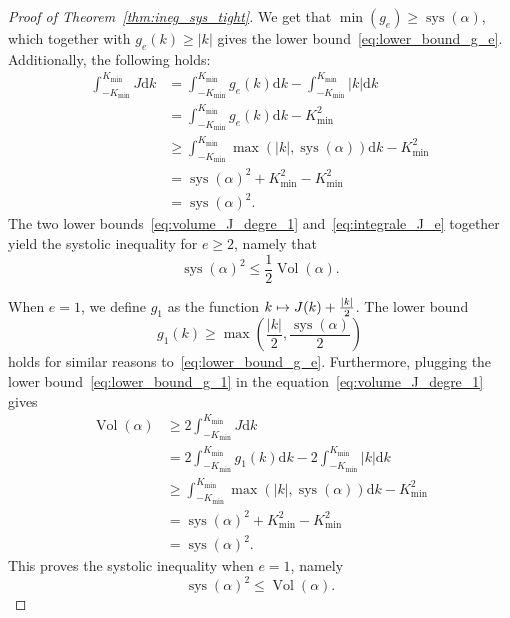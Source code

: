 \documentclass[10pt,a4paper]{amsart}
\DeclareMathOperator{\vol}{Vol}
\DeclareMathOperator{\sys}{sys}
\newcommand{\rmd}{\mathrm{d}}
\let\oldmapsto\mapsto
\renewcommand*{\mapsto}{\mathchoice{\longmapsto}{\oldmapsto}{\oldmapsto}{\oldmapsto}}
\theoremstyle{definition}\newtheorem{defi}[theo]{Definition}
\begin{document}
\begin{proof}[{Proof of Theorem~\ref{thm:ineg_sys_tight}}]
We get that $\min(g_e) \geq \sys(\alpha)$, which together with $g_e(k) \geq |k|$ gives the lower bound~\eqref{eq:lower_bound_g_e}. Additionally, the following holds:
\begin{equation}\label{eq:integrale_J_e}
\begin{split}
\int_{-K_{\min}}^{K_{\min}} J \rmd k &= \int_{-K_{\min}}^{K_{\min}} g_e(k) \rmd k - \int_{-K_{\min}}^{K_{\min}}|k| \rmd k \\
&= \int_{-K_{\min}}^{K_{\min}} g_e(k) \rmd k - K_{\min}^2 \\
&\geq \int_{-K_{\min}}^{K_{\min}} \max\left(|k|, \sys(\alpha)\right) \rmd k - K_{\min}^2 \\
&= \sys(\alpha)^2 + K_{\min}^2 - K_{\min}^2 \\
&= \sys(\alpha)^2.
\end{split}
\end{equation}
The two lower bounds~\eqref{eq:volume_J_degre_1} and~\eqref{eq:integrale_J_e} together yield the systolic inequality for $e\geq 2$, namely that
\begin{equation}\label{eq:ineg_sys_e_2}
\sys(\alpha)^2 \leq \frac{1}{2} \vol(\alpha).
\end{equation}

When $e=1$, we define $g_1$ as the function $k \mapsto J(k) + \frac{|k|}{2}$. The lower bound
\begin{equation}\label{eq:lower_bound_g_1}
g_1(k) \geq \max\left(\frac{|k|}{2}, \frac{\sys(\alpha)}{2}\right)
\end{equation}
holds for similar reasons to~\eqref{eq:lower_bound_g_e}. Furthermore, plugging the lower bound~\eqref{eq:lower_bound_g_1} in the equation~\eqref{eq:volume_J_degre_1} gives
\begin{equation}
\begin{split}\label{eq:integrale_J_1}
\vol(\alpha) &\geq 2 \int_{-K_{\min}}^{K_{\min}} J \rmd k \\
&= 2\int_{-K_{\min}}^{K_{\min}} g_1(k) \rmd k - 2\int_{-K_{\min}}^{K_{\min}}|k| \rmd k \\
&\geq \int_{-K_{\min}}^{K_{\min}} \max\left(|k|, \sys(\alpha)\right) \rmd k - K_{\min}^2 \\
&= \sys(\alpha)^2 + K_{\min}^2 - K_{\min}^2 \\
&= \sys(\alpha)^2.
\end{split}
\end{equation}
This proves the systolic inequality when $e=1$, namely
\begin{equation}\label{eq:ineg_sys_e_1}
\sys(\alpha)^2 \leq \vol(\alpha).
\end{equation}


\end{proof}
\end{document}
